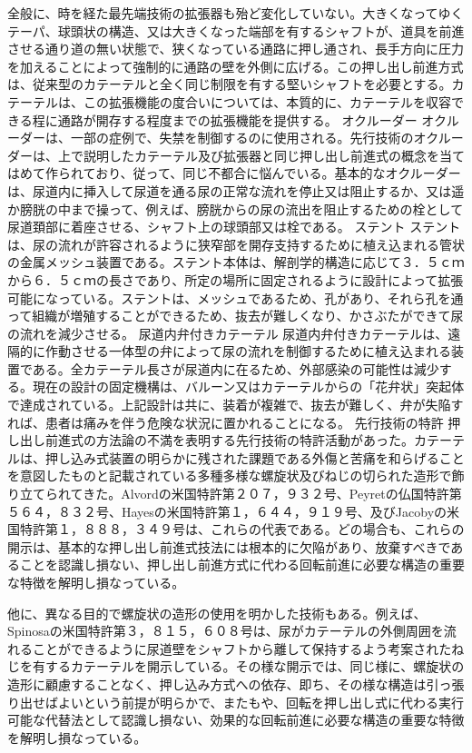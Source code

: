 全般に、時を経た最先端技術の拡張器も殆ど変化していない。大きくなってゆくテーパ、球頭状の構造、又は大きくなった端部を有するシャフトが、道具を前進させる通り道の無い状態で、狭くなっている通路に押し通され、長手方向に圧力を加えることによって強制的に通路の壁を外側に広げる。この押し出し前進方式は、従来型のカテーテルと全く同じ制限を有する堅いシャフトを必要とする。カテーテルは、この拡張機能の度合いについては、本質的に、カテーテルを収容できる程に通路が開存する程度までの拡張機能を提供する。 オクルーダー オクルーダーは、一部の症例で、失禁を制御するのに使用される。先行技術のオクルーダーは、上で説明したカテーテル及び拡張器と同じ押し出し前進式の概念を当てはめて作られており、従って、同じ不都合に悩んでいる。基本的なオクルーダーは、尿道内に挿入して尿道を通る尿の正常な流れを停止又は阻止するか、又は遥か膀胱の中まで操って、例えば、膀胱からの尿の流出を阻止するための栓として尿道頚部に着座させる、シャフト上の球頭部又は栓である。 ステント ステントは、尿の流れが許容されるように狭窄部を開存支持するために植え込まれる管状の金属メッシュ装置である。ステント本体は、解剖学的構造に応じて３．５ｃｍから６．５ｃｍの長さであり、所定の場所に固定されるように設計によって拡張可能になっている。ステントは、メッシュであるため、孔があり、それら孔を通って組織が増殖することができるため、抜去が難しくなり、かさぶたができて尿の流れを減少させる。 尿道内弁付きカテーテル 尿道内弁付きカテーテルは、遠隔的に作動させる一体型の弁によって尿の流れを制御するために植え込まれる装置である。全カテーテル長さが尿道内に在るため、外部感染の可能性は減少する。現在の設計の固定機構は、バルーン又はカテーテルからの「花弁状」突起体で達成されている。上記設計は共に、装着が複雑で、抜去が難しく、弁が失陥すれば、患者は痛みを伴う危険な状況に置かれることになる。 先行技術の特許 押し出し前進式の方法論の不満を表明する先行技術の特許活動があった。カテーテルは、押し込み式装置の明らかに残された課題である外傷と苦痛を和らげることを意図したものと記載されている多種多様な螺旋状及びねじの切られた造形で飾り立てられてきた。Alvordの米国特許第２０７，９３２号、Peyretの仏国特許第５６４，８３２号、Hayesの米国特許第１，６４４，９１９号、及びJacobyの米国特許第１，８８８，３４９号は、これらの代表である。どの場合も、これらの開示は、基本的な押し出し前進式技法には根本的に欠陥があり、放棄すべきであることを認識し損ない、押し出し前進方式に代わる回転前進に必要な構造の重要な特徴を解明し損なっている。

他に、異なる目的で螺旋状の造形の使用を明かした技術もある。例えば、Spinosaの米国特許第３，８１５，６０８号は、尿がカテーテルの外側周囲を流れることができるように尿道壁をシャフトから離して保持するよう考案されたねじを有するカテーテルを開示している。その様な開示では、同じ様に、螺旋状の造形に顧慮することなく、押し込み方式への依存、即ち、その様な構造は引っ張り出せばよいという前提が明らかで、またもや、回転を押し出し式に代わる実行可能な代替法として認識し損ない、効果的な回転前進に必要な構造の重要な特徴を解明し損なっている。

